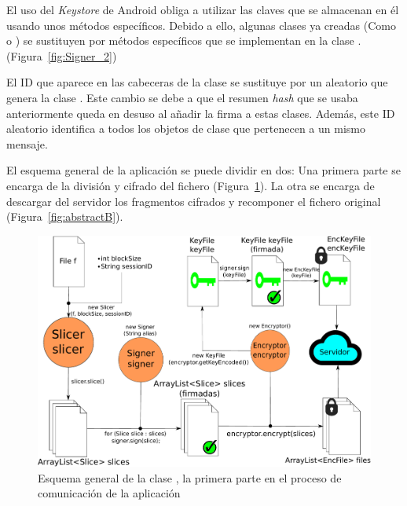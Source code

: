 El uso del \emph{Keystore} de Android obliga a utilizar las claves que se almacenan en él usando unos métodos específicos. Debido a ello, algunas clases ya creadas (Como  o ) se sustituyen por métodos específicos que se implementan en la clase . (Figura~\ref{fig:Signer_2})

El ID que aparece en las cabeceras de la clase  se sustituye por un  aleatorio que genera la clase . Este cambio se debe a que el resumen \emph{hash} que se usaba anteriormente queda en desuso al añadir la firma a estas clases. Además, este ID aleatorio identifica a todos los objetos de clase  que pertenecen a un mismo mensaje.

El esquema general de la aplicación se puede dividir en dos: Una primera parte se encarga de la división y cifrado del fichero (Figura~\ref{fig:abstractA}). La otra se encarga de descargar del servidor los fragmentos cifrados y recomponer el fichero original (Figura~\ref{fig:abstractB}).

\begin{figure}[!htb]
  \centering
  \includegraphics[scale=0.5]{Figures/abstractA}
  \decoRule
  \caption[]{Esquema general de la clase , la primera parte en el proceso de comunicación de la aplicación}
  \label{fig:abstractA}
\end{figure}

